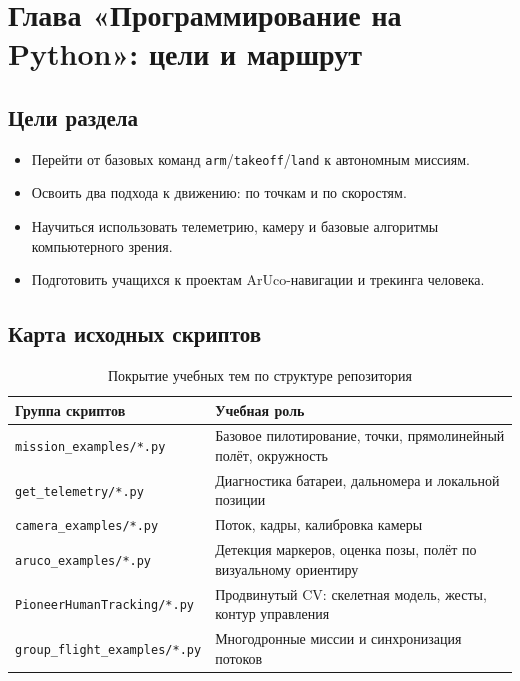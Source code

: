 \section{Глава «Программирование на Python»: цели и маршрут}

\subsection*{Цели раздела}
\begin{itemize}
\item Перейти от базовых команд \texttt{arm}/\texttt{takeoff}/\texttt{land} к автономным миссиям.
\item Освоить два подхода к движению: по точкам и по скоростям.
\item Научиться использовать телеметрию, камеру и базовые алгоритмы компьютерного зрения.
\item Подготовить учащихся к проектам ArUco-навигации и трекинга человека.
\end{itemize}

\subsection{Карта исходных скриптов}
\begin{table}[H]
\centering
\begin{tabularx}{\textwidth}{>{\raggedright\arraybackslash}p{}>{\raggedright\arraybackslash}X}
\toprule
Группа скриптов & Учебная роль \\
\midrule
\texttt{mission\_examples/*.py} & Базовое пилотирование, точки, прямолинейный полёт, окружность \\
\texttt{get\_telemetry/*.py} & Диагностика батареи, дальномера и локальной позиции \\
\texttt{camera\_examples/*.py} & Поток, кадры, калибровка камеры \\
\texttt{aruco\_examples/*.py} & Детекция маркеров, оценка позы, полёт по визуальному ориентиру \\
\texttt{PioneerHumanTracking/*.py} & Продвинутый CV: скелетная модель, жесты, контур управления \\
\texttt{group\_flight\_examples/*.py} & Многодронные миссии и синхронизация потоков \\
\bottomrule
\end{tabularx}
\caption{Покрытие учебных тем по структуре репозитория}
\end{table}

